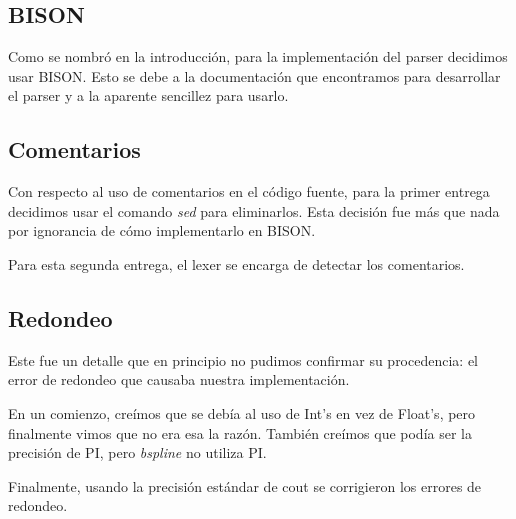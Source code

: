 \subsection{BISON}
Como se nombró en la introducción, para la implementación del parser decidimos usar BISON. Esto se debe a la documentación que encontramos para desarrollar el parser y a la aparente sencillez para usarlo.

\subsection{Comentarios}
Con respecto al uso de comentarios en el código fuente, para la primer entrega decidimos usar el comando \textit{sed} para eliminarlos. Esta decisión fue más que nada por ignorancia de cómo implementarlo en BISON. 

Para esta segunda entrega, el lexer se encarga de detectar los comentarios.


\subsection{Redondeo}
Este fue un detalle que en principio no pudimos confirmar su procedencia: el error de redondeo que causaba nuestra implementación.

En un comienzo, creímos que se debía al uso de Int's en vez de Float's, pero finalmente vimos que no era esa la razón. También creímos que podía ser la precisión de PI, pero \textit{bspline} no utiliza PI.

Finalmente, usando la precisión estándar de cout se corrigieron los errores de redondeo.

